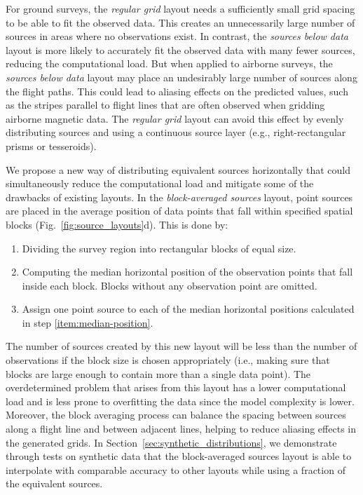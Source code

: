 For ground surveys, the \emph{regular grid} layout needs a sufficiently
small grid spacing to be able to fit the observed data.
This creates an unnecessarily large number of sources in areas where no
observations exist.
In contrast, the \emph{sources below data} layout is more likely to accurately
fit the observed data with many fewer sources, reducing the computational load.
But when applied to airborne surveys, the \emph{sources below data} layout may
place an undesirably large number of sources along the flight paths.
This could lead to aliasing effects on the predicted values, such as the
stripes parallel to flight lines that are often observed when gridding airborne
magnetic data.
The \emph{regular grid} layout can avoid this effect by evenly
distributing sources and using a continuous source layer (e.g.,
right-rectangular prisms or tesseroids).

We propose a new way of distributing equivalent sources horizontally that could
simultaneously reduce the computational load and mitigate some of the drawbacks
of existing layouts.
In the \emph{block-averaged sources} layout,
point sources are placed in the average
position of data points that fall within specified spatial blocks
(Fig.~\ref{fig:source_layouts}d).
This is done by:

\begin{enumerate}
    \item Dividing the survey region into rectangular blocks of equal size.
    \item \label{item:median-position} Computing the median horizontal position
        of the observation points that fall inside each block. Blocks without
        any observation point are omitted.
    \item Assign one point source to each of the median horizontal positions
      calculated in step \ref{item:median-position}.
\end{enumerate}

The number of sources created by this new layout will be less than the number
of observations if the block size is chosen appropriately (i.e., making sure
that blocks are large enough to contain more than a single data point).
The overdetermined problem that arises from this layout has a lower
computational load and is less prone to overfitting the data since the model
complexity is lower.
Moreover, the block averaging process can balance the spacing between sources
along a flight line and between adjacent lines, helping to reduce aliasing
effects in the generated grids.
In Section~\ref{sec:synthetic_distributions}, we demonstrate through tests on
synthetic data that the block-averaged sources layout is able to interpolate
with comparable accuracy to other layouts while using a fraction of the
equivalent sources.


